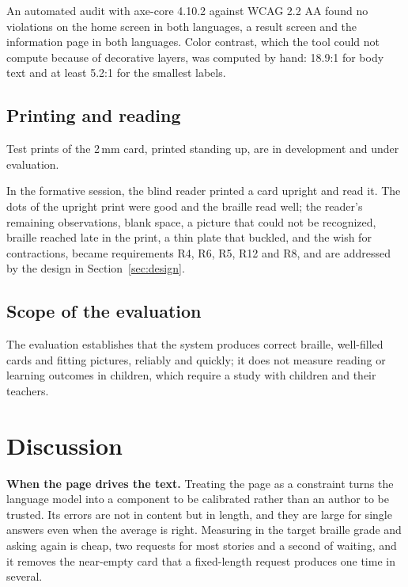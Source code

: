 \documentclass[conference]{IEEEtran}
\begin{document}
An automated audit with axe-core 4.10.2 against WCAG 2.2 AA found no violations on the home screen in both languages, a result screen and the information page in both languages. Color contrast, which the tool could not compute because of decorative layers, was computed by hand: 18.9:1 for body text and at least 5.2:1 for the smallest labels.

\subsection{Printing and reading}

Test prints of the 2\,mm card, printed standing up, are in development and under evaluation.

In the formative session, the blind reader printed a card upright and read it. The dots of the upright print were good and the braille read well; the reader's remaining observations, blank space, a picture that could not be recognized, braille reached late in the print, a thin plate that buckled, and the wish for contractions, became requirements R4, R6, R5, R12 and R8, and are addressed by the design in Section~\ref{sec:design}.

\subsection{Scope of the evaluation}

The evaluation establishes that the system produces correct braille, well-filled cards and fitting pictures, reliably and quickly; it does not measure reading or learning outcomes in children, which require a study with children and their teachers.

\section{Discussion}\label{sec:discussion}

\textbf{When the page drives the text.} Treating the page as a constraint turns the language model into a component to be calibrated rather than an author to be trusted. Its errors are not in content but in length, and they are large for single answers even when the average is right. Measuring in the target braille grade and asking again is cheap, two requests for most stories and a second of waiting, and it removes the near-empty card that a fixed-length request produces one time in several.
\end{document}
